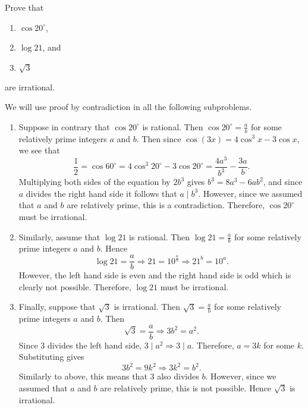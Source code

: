 \begin{question}
    Prove that
    \begin{enumerate}
        \item $\cos 20^\circ$,
        
        \item $\log 21$, and 
        
        \item $\sqrt{3}$ 
    \end{enumerate}
    are irrational.
\end{question}
\begin{solution}
    We will use proof by contradiction in all the following subproblems.
    \begin{enumerate}
        \item Suppose in contrary that $\cos 20^\circ$ is rational. Then $\cos
            20^\circ = \frac{a}{b}$ for some relatively prime integers $a$ and
            $b$. Then since $\cos(3x) = 4\cos^3 x - 3\cos x$, we see that
        \[ \frac{1}{2} = \cos 60^\circ = 4 \cos^3 20^\circ - 3\cos 20^\circ =
        \frac{4a^3}{b^3} - \frac{3a}{b}. \]
        Multiplying both sides of the equation by $2b^3$ gives $b^3 = 8a^3 -
        6ab^2$, and since $a$ divides the right hand side it follows that $a
        \mid b^3$. However, since we assumed that $a$ and $b$ are relatively
        prime, this is a contradiction. Therefore, $\cos 20^\circ$ must be
        irrational.

        \item Similarly, assume that $\log 21$ is rational. Then $\log 21 =
            \frac{a}{b}$ for some relatively prime integers $a$ and $b$. Hence
            \[ \log 21 = \frac{a}{b} \Longrightarrow 21 = 10^\frac{a}{b}
            \Longrightarrow 21^b = 10^a. \]
            However, the left hand side is even and the right hand side is odd
            which is clearly not possible. Therefore, $\log 21$ must be
            irrational. 

        \item Finally, suppose that $\sqrt{3}$ is irrational. Then $\sqrt{3} =
            \frac{a}{b}$ for some relatively prime integers $a$ and $b$. Then 
            \[ \sqrt{3} = \frac{a}{b} \Longrightarrow 3b^2 = a^2. \]
            Since 3 divides the left hand side, $3 \mid a^2 \Rightarrow 3 \mid
            a$. Therefore, $a = 3k$ for some $k$. Substituting gives
            \[ 3b^2 = 9k^2 \Longrightarrow 3k^2 = b^2. \]
            Similarly to above, this means that 3 also divides $b$. However,
            since we assumed that $a$ and $b$ are relatively prime, this is not
            possible. Hence $\sqrt{3}$ is irrational. \qedhere
    \end{enumerate}
\end{solution}

